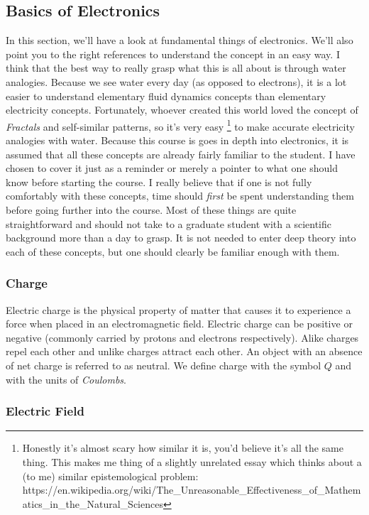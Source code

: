 \subsection{Basics of Electronics}

In this section, we'll have a look at fundamental things of electronics.  We'll also point you to the right references to understand the concept in an easy way. I think that the best way to really grasp what this is all about is through water analogies. Because we see water every day (as opposed to electrons), it is a lot easier to understand elementary fluid dynamics concepts than elementary electricity concepts. Fortunately, whoever created this world loved the concept of \textit{Fractals} and self-similar patterns, so it's very easy \footnote{Honestly it's almost scary how similar it is, you'd believe it's all the same thing. This makes me thing of a slightly unrelated essay which thinks about a (to me) similar epistemological problem: https://en.wikipedia.org/wiki/The_Unreasonable\_Effectiveness\_of\_Mathematics\_in\_the\_Natural\_Sciences} to make accurate electricity analogies with water.  
Because this course is goes in depth into electronics, it is assumed that all these concepts are already fairly familiar to the student. I have chosen to cover it just as a reminder or merely a pointer to what one should know before starting the course. I really believe that if one is not fully comfortably with these concepts, time should \textit{first} be spent understanding them before going further into the course. Most of these things are quite straightforward and should not take to a graduate student with a scientific background more than a day to grasp. It is not needed to enter deep theory into each of these concepts, but one should clearly be familiar enough with them. 

\subsubsection{Charge}

Electric charge is the physical property of matter that causes it to experience a force when placed in an electromagnetic field. Electric charge can be positive or negative (commonly carried by protons and electrons respectively). Alike charges repel each other and unlike charges attract each other. An object with an absence of net charge is referred to as neutral. We define charge with the symbol $Q$ and with the units of \textit{Coulombs}. 

\subsubsection{Electric Field}


